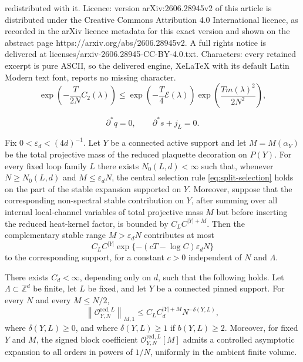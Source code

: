 \documentclass[10pt,a4paper]{amsart}
\newcommand\Z{{\mathbb{Z}}}
\begin{document}
redistributed with it. Licence: version arXiv:2606.28945v2 of this article is distributed under the Creative Commons Attribution 4.0 International licence, as recorded in the arXiv licence metadata for this exact version and shown on the abstract page https://arxiv.org/abs/2606.28945v2. A full rights notice is delivered at licenses/arxiv-2606.28945-CC-BY-4.0.txt. Characters: every retained excerpt is pure ASCII, so the delivered engine, XeLaTeX with its default Latin Modern text font, reports no missing character.
\begin{equation}\label{eq:spectral-decay}
\exp\left(-\frac{T}{2N}C_2(\lambda)\right)\leq \exp\left(-\frac{T}{4}\mathcal E(\lambda)\right)\exp\left(\frac{T m(\lambda)^2}{2N^2}\right),
\end{equation}

\begin{equation}\label{eq:split-selection}
\partial^*q=0,
\qquad
\partial^*s+j_L=0.
\end{equation}

\begin{lemma}\label{lem:central-cutoff}
Fix $0<\varepsilon_d<(4d)^{-1}$.  Let $Y$ be a connected active support and let $M=M(\alpha_Y)$ be the total projective mass of the reduced plaquette decoration on $P(Y)$.  For every fixed loop family $L$ there exists $N_0(L,d)<\infty$ such that, whenever $N\ge N_0(L,d)$ and $M\leq \varepsilon_d N$, the central selection rule \eqref{eq:split-selection} holds on the part of the stable expansion supported on $Y$. Moreover, suppose that the corresponding non-spectral stable contribution on $Y$, after summing over all internal local-channel variables of total projective mass $M$ but before inserting the reduced heat-kernel factor, is bounded by $C_LC^{|Y|+M}$.  Then the complementary stable range $M>\varepsilon_dN$ contributes at most
\begin{equation}\label{eq:stable-large-mass-tail}
C_L C^{|Y|}\exp\{-(cT-\log C)\varepsilon_d N\}
\end{equation}
to the corresponding support, for a constant $c>0$ independent of $N$ and $\Lambda$.
\end{lemma}

\begin{theorem}\label{thm:pinned-block}
There exists $C_d<\infty$, depending only on $d$, such that the following holds.  Let $\Lambda\subset\Z^d$ be finite, let $L$ be fixed, and let $Y$ be a connected pinned support.  For every $N$ and every $M\le N/2$,
\begin{equation}
\label{eq:pinned-block-bound}
\left\|\mathcal O_{Y,N}^{\mathrm{red},L}\right\|_{M,1}
\le
C_L C_d^{|Y|+M}N^{-\delta(Y,L)},
\end{equation}
where $\delta(Y,L)\ge0$, and where $\delta(Y,L)\ge1$ if $b(Y,L)\ge2$.  Moreover, for fixed $Y$ and $M$, the signed block coefficient $\mathcal O_{Y,N}^{\mathrm{red},L}[M]$ admits a controlled asymptotic expansion to all orders in powers of $1/N$, uniformly in the ambient finite volume.
\end{theorem}
\end{document}
